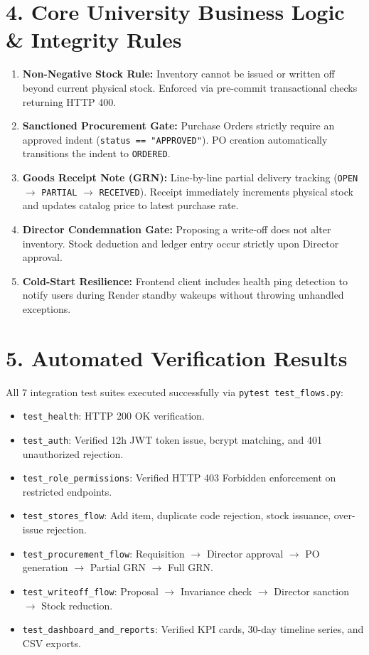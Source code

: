 \documentclass[11pt,a4paper]{article}
\begin{document}
\section{4. Core University Business Logic \& Integrity Rules}
\begin{enumerate}[noitemsep]
    \item \textbf{Non-Negative Stock Rule:} Inventory cannot be issued or written off beyond current physical stock. Enforced via pre-commit transactional checks returning HTTP 400.
    \item \textbf{Sanctioned Procurement Gate:} Purchase Orders strictly require an approved indent (\texttt{status == "APPROVED"}). PO creation automatically transitions the indent to \texttt{ORDERED}.
    \item \textbf{Goods Receipt Note (GRN):} Line-by-line partial delivery tracking (\texttt{OPEN} $\rightarrow$ \texttt{PARTIAL} $\rightarrow$ \texttt{RECEIVED}). Receipt immediately increments physical stock and updates catalog price to latest purchase rate.
    \item \textbf{Director Condemnation Gate:} Proposing a write-off does not alter inventory. Stock deduction and ledger entry occur strictly upon Director approval.
    \item \textbf{Cold-Start Resilience:} Frontend client includes health ping detection to notify users during Render standby wakeups without throwing unhandled exceptions.
\end{enumerate}

\section{5. Automated Verification Results}
All 7 integration test suites executed successfully via \texttt{pytest test\_flows.py}:
\begin{itemize}[noitemsep]
    \item \texttt{test\_health}: HTTP 200 OK verification.
    \item \texttt{test\_auth}: Verified 12h JWT token issue, bcrypt matching, and 401 unauthorized rejection.
    \item \texttt{test\_role\_permissions}: Verified HTTP 403 Forbidden enforcement on restricted endpoints.
    \item \texttt{test\_stores\_flow}: Add item, duplicate code rejection, stock issuance, over-issue rejection.
    \item \texttt{test\_procurement\_flow}: Requisition $\rightarrow$ Director approval $\rightarrow$ PO generation $\rightarrow$ Partial GRN $\rightarrow$ Full GRN.
    \item \texttt{test\_writeoff\_flow}: Proposal $\rightarrow$ Invariance check $\rightarrow$ Director sanction $\rightarrow$ Stock reduction.
    \item \texttt{test\_dashboard\_and\_reports}: Verified KPI cards, 30-day timeline series, and CSV exports.
\end{itemize}
\end{document}
